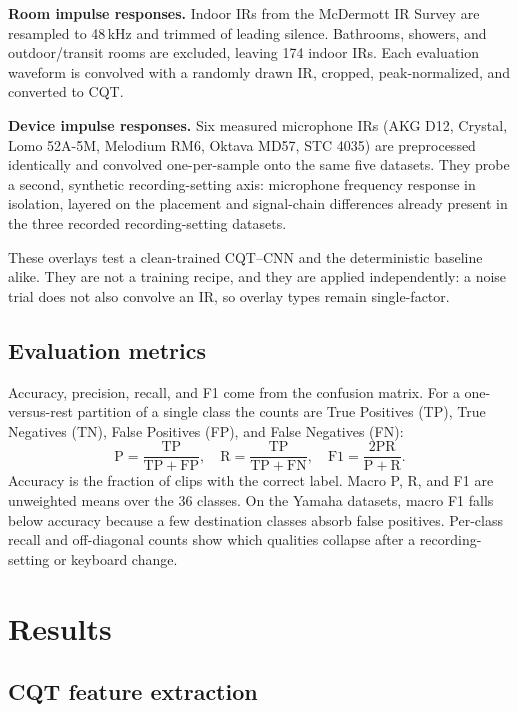 \documentclass[pdflatex,sn-mathphys-num,iicol]{sn-jnl}
\theoremstyle{thmstyleone}
\theoremstyle{thmstyletwo}
\theoremstyle{thmstylethree}
\begin{document}
\textbf{Room impulse responses.} Indoor IRs from the McDermott IR Survey \cite{Traer2016} are resampled to 48\,kHz and trimmed of leading silence. Bathrooms, showers, and outdoor/transit rooms are excluded, leaving 174 indoor IRs. Each evaluation waveform is convolved with a randomly drawn IR, cropped, peak-normalized, and converted to CQT.

\textbf{Device impulse responses.} Six measured microphone IRs (AKG D12, Crystal, Lomo 52A-5M, Melodium RM6, Oktava MD57, STC 4035) are preprocessed identically and convolved one-per-sample onto the same five datasets. They probe a second, synthetic recording-setting axis: microphone frequency response in isolation, layered on the placement and signal-chain differences already present in the three recorded recording-setting datasets.

These overlays test a clean-trained CQT--CNN and the deterministic baseline alike. They are not a training recipe, and they are applied independently: a noise trial does not also convolve an IR, so overlay types remain single-factor.

\subsection{Evaluation metrics}\label{subsec3_6}

Accuracy, precision, recall, and F1 come from the confusion matrix. For a one-versus-rest partition of a single class the counts are True Positives (TP), True Negatives (TN), False Positives (FP), and False Negatives (FN):
\begin{equation}
\mathrm{P}=\frac{\mathrm{TP}}{\mathrm{TP}+\mathrm{FP}},\quad
\mathrm{R}=\frac{\mathrm{TP}}{\mathrm{TP}+\mathrm{FN}},\quad
\mathrm{F1}=\frac{2\mathrm{PR}}{\mathrm{P}+\mathrm{R}}.
\label{eq:prf}
\end{equation}
Accuracy is the fraction of clips with the correct label. Macro P, R, and F1 are unweighted means over the 36 classes. On the Yamaha datasets, macro F1 falls below accuracy because a few destination classes absorb false positives. Per-class recall and off-diagonal counts show which qualities collapse after a recording-setting or keyboard change.

\section{Results}\label{sec4}

\subsection{CQT feature extraction}\label{subsec4_1}
\end{document}
